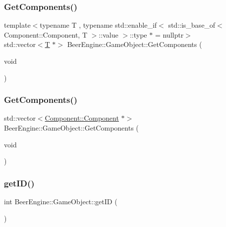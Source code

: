 \subsubsection{\texorpdfstring{Get\+Components()}{GetComponents()}\hspace{0.1cm}{\footnotesize\ttfamily [1/2]}}
{\footnotesize\ttfamily template$<$typename T , typename std\+::enable\+\_\+if$<$ std\+::is\+\_\+base\+\_\+of$<$ Component\+::\+Component, T $>$\+::value $>$\+::type $\ast$  = nullptr$>$ \\
std\+::vector$<$\mbox{\hyperlink{namespace_beer_engine_a94f0b552f6dc910de8cdb44207981f53a8de48e594408f9fc561b2f68ce05f664}{T}} $\ast$$>$ Beer\+Engine\+::\+Game\+Object\+::\+Get\+Components (\begin{DoxyParamCaption}\item[{void}]{ }\end{DoxyParamCaption})\hspace{0.3cm}{\ttfamily [inline]}}

\mbox{\label{class_beer_engine_1_1_game_object_a090858d4edf1420427cd329688bc2e7c}} 
\subsubsection{\texorpdfstring{Get\+Components()}{GetComponents()}\hspace{0.1cm}{\footnotesize\ttfamily [2/2]}}
{\footnotesize\ttfamily std\+::vector$<$\mbox{\hyperlink{class_beer_engine_1_1_component_1_1_component}{Component\+::\+Component}} $\ast$$>$ Beer\+Engine\+::\+Game\+Object\+::\+Get\+Components (\begin{DoxyParamCaption}\item[{void}]{ }\end{DoxyParamCaption})}

\mbox{\label{class_beer_engine_1_1_game_object_a36782b2d17c0e576ab740903c5cfeab0}} 
\subsubsection{\texorpdfstring{get\+I\+D()}{getID()}}
{\footnotesize\ttfamily int Beer\+Engine\+::\+Game\+Object\+::get\+ID (\begin{DoxyParamCaption}{ }\end{DoxyParamCaption})}

